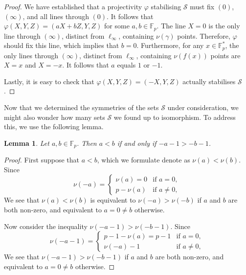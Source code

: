 \documentclass[a4paper, 12pt]{article}
\newtheorem{lm}[thm]{Lemma}
\theoremstyle{definition}
\newcommand{\FF}{\mathbb F}
\newcommand{\ms}{\mathcal S}
\begin{document}
\begin{proof}
 We have established that a projectivity $\varphi$ stabilising $\ms$ must fix $(0)$, $(\infty)$, and all lines through $(0)$.
 It follows that $\varphi(X,Y,Z) = (aX+bZ,Y,Z)$ for some $a,b \in \FF_p$.
 The line $X=0$ is the only line through $(\infty)$, distinct from $\ell_\infty$, containing $\nu(\gamma)$ points.
 Therefore, $\varphi$ should fix this line, which implies that $b=0$.
 Furthermore, for any $x\in \FF_p^*$, the only lines through $(\infty)$, distinct from $\ell_\infty$, containing $\nu(f(x))$ points are $X=x$ and $X=-x$.
 It follows that $a$ equals $1$ or $-1$.

 Lastly, it is easy to check that $\varphi(X,Y,Z) = (-X,Y,Z)$ actually stabilises $\ms$.
\end{proof}

Now that we determined the symmetries of the sets $\ms$ under consideration, we might also wonder how many sets $\ms$ we found up to isomorphism.
To address this, we use the following lemma.

\begin{lm}
 \label{Lm:Equiv Ineq}
 Let $a, b \in \FF_p$.
 Then $a < b$ if and only if $-a-1 > -b-1$.
\end{lm}

\begin{proof}
 First suppose that $a < b$, which we formulate denote as $\nu(a) < \nu(b)$.
 Since
 \[
  \nu(-a) = \begin{cases}
   \nu(a) = 0 & \text{if } a = 0, \\
   p-\nu(a) & \text{if } a \neq 0,
  \end{cases}
 \]
 We see that $\nu(a) < \nu(b)$ is equivalent to $\nu(-a) > \nu(-b)$ if $a$ and $b$ are both non-zero, and equivalent to $a = 0 \neq b$ otherwise.

 Now consider the inequality $\nu(-a-1) > \nu(-b-1)$.
 Since
 \[
  \nu(-a-1) = \begin{cases}
   p - 1 - \nu(a) = p-1 & \text{if } a = 0, \\
   \nu(-a) - 1 & \text{if } a \neq 0, 
  \end{cases}
 \]
 We see that $\nu(-a-1) > \nu(-b-1)$ if $a$ and $b$ are both non-zero, and equivalent to $a=0 \neq b$ otherwise.
\end{proof}
\end{document}
